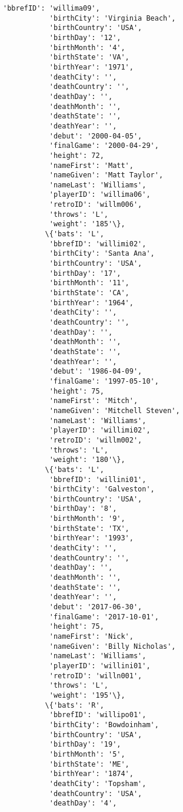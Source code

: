 \documentclass[11pt]{article}
\begin{document}
\begin{Verbatim}[commandchars=\\\{\}]
           'bbrefID': 'willima09',
           'birthCity': 'Virginia Beach',
           'birthCountry': 'USA',
           'birthDay': '12',
           'birthMonth': '4',
           'birthState': 'VA',
           'birthYear': '1971',
           'deathCity': '',
           'deathCountry': '',
           'deathDay': '',
           'deathMonth': '',
           'deathState': '',
           'deathYear': '',
           'debut': '2000-04-05',
           'finalGame': '2000-04-29',
           'height': 72,
           'nameFirst': 'Matt',
           'nameGiven': 'Matt Taylor',
           'nameLast': 'Williams',
           'playerID': 'willima06',
           'retroID': 'willm006',
           'throws': 'L',
           'weight': '185'\},
          \{'bats': 'L',
           'bbrefID': 'willimi02',
           'birthCity': 'Santa Ana',
           'birthCountry': 'USA',
           'birthDay': '17',
           'birthMonth': '11',
           'birthState': 'CA',
           'birthYear': '1964',
           'deathCity': '',
           'deathCountry': '',
           'deathDay': '',
           'deathMonth': '',
           'deathState': '',
           'deathYear': '',
           'debut': '1986-04-09',
           'finalGame': '1997-05-10',
           'height': 75,
           'nameFirst': 'Mitch',
           'nameGiven': 'Mitchell Steven',
           'nameLast': 'Williams',
           'playerID': 'willimi02',
           'retroID': 'willm002',
           'throws': 'L',
           'weight': '180'\},
          \{'bats': 'L',
           'bbrefID': 'willini01',
           'birthCity': 'Galveston',
           'birthCountry': 'USA',
           'birthDay': '8',
           'birthMonth': '9',
           'birthState': 'TX',
           'birthYear': '1993',
           'deathCity': '',
           'deathCountry': '',
           'deathDay': '',
           'deathMonth': '',
           'deathState': '',
           'deathYear': '',
           'debut': '2017-06-30',
           'finalGame': '2017-10-01',
           'height': 75,
           'nameFirst': 'Nick',
           'nameGiven': 'Billy Nicholas',
           'nameLast': 'Williams',
           'playerID': 'willini01',
           'retroID': 'willn001',
           'throws': 'L',
           'weight': '195'\},
          \{'bats': 'R',
           'bbrefID': 'willipo01',
           'birthCity': 'Bowdoinham',
           'birthCountry': 'USA',
           'birthDay': '19',
           'birthMonth': '5',
           'birthState': 'ME',
           'birthYear': '1874',
           'deathCity': 'Topsham',
           'deathCountry': 'USA',
           'deathDay': '4',

\end{Verbatim}
\end{document}
